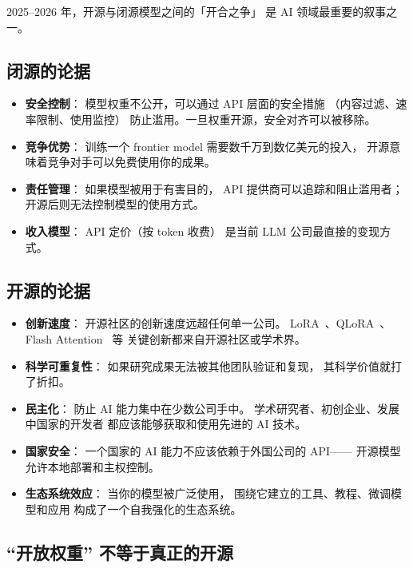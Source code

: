 2025--2026 年，开源与闭源模型之间的「开合之争」
是 AI 领域最重要的叙事之一。

\subsection{闭源的论据}

\begin{itemize}[noitemsep]
  \item \textbf{安全控制}：
        模型权重不公开，可以通过 API 层面的安全措施
        （内容过滤、速率限制、使用监控）
        防止滥用。一旦权重开源，安全对齐可以被移除。
  \item \textbf{竞争优势}：
        训练一个 frontier model 需要数千万到数亿美元的投入，
        开源意味着竞争对手可以免费使用你的成果。
  \item \textbf{责任管理}：
        如果模型被用于有害目的，
        API 提供商可以追踪和阻止滥用者；
        开源后则无法控制模型的使用方式。
  \item \textbf{收入模型}：
        API 定价（按 token 收费）
        是当前 LLM 公司最直接的变现方式。
\end{itemize}

\subsection{开源的论据}

\begin{itemize}[noitemsep]
  \item \textbf{创新速度}：
        开源社区的创新速度远超任何单一公司。
        LoRA~\cite{hu2021lora}、QLoRA~\cite{dettmers2023qlora}、
        Flash Attention~\cite{dao2022flashattention} 等
        关键创新都来自开源社区或学术界。
  \item \textbf{科学可重复性}：
        如果研究成果无法被其他团队验证和复现，
        其科学价值就打了折扣。
  \item \textbf{民主化}：
        防止 AI 能力集中在少数公司手中。
        学术研究者、初创企业、发展中国家的开发者
        都应该能够获取和使用先进的 AI 技术。
  \item \textbf{国家安全}：
        一个国家的 AI 能力不应该依赖于外国公司的 API——
        开源模型允许本地部署和主权控制。
  \item \textbf{生态系统效应}：
        当你的模型被广泛使用，
        围绕它建立的工具、教程、微调模型和应用
        构成了一个自我强化的生态系统。
\end{itemize}

\subsection{``开放权重'' 不等于真正的开源}

